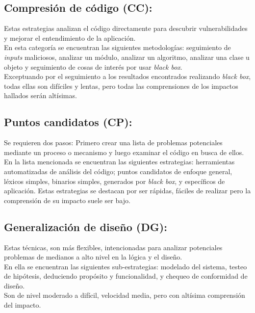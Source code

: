 \subsection{Compresión de código (CC):}
Estas estrategias analizan el código directamente para descubrir vulnerabilidades y mejorar el entendimiento de la aplicación.\\

En esta categoría se encuentran las siguientes metodologías: seguimiento de \textit{inputs} maliciosos, analizar un módulo, analizar un algoritmo, analizar una clase u objeto y seguimiento de cosas de interés por usar \textit{black box}.\\

Exceptuando por el seguimiento a los resultados encontrados realizando \textit{black box}, todas ellas son difíciles y lentas, pero todas las comprensiones de los impactos hallados serán altísimas.

\subsection{Puntos candidatos (CP):}
Se requieren dos pasos: Primero crear una lista de problemas potenciales mediante un proceso o mecanismo y luego examinar el código en busca de ellos.\\

En la lista mencionada se encuentran las siguientes estrategias: herramientas automatizadas de análisis del código; puntos candidatos de enfoque general, léxicos simples, binarios simples, generados por \textit{black box}, y específicos de aplicación. Estas estrategias se destacan por ser rápidas, fáciles de realizar pero la comprensión de su impacto suele ser bajo.

\subsection{Generalización de diseño (DG):}
Estas técnicas, son más flexibles, intencionadas para analizar potenciales problemas de medianos a alto nivel en la lógica y el diseño.\\

En ella se encuentran las siguientes sub-estrategias: modelado del sistema, testeo de hipótesis, deduciendo propósito y funcionalidad, y chequeo de conformidad de diseño.\\

Son de nivel moderado a difícil, velocidad media, pero con altísima comprensión del impacto.

